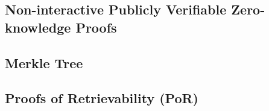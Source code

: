 



\subsection{Non-interactive Publicly Verifiable Zero-knowledge Proofs}

\subsection{Merkle Tree}

\subsection{Proofs of Retrievability (PoR)}\label{PoR-def}





 

%

